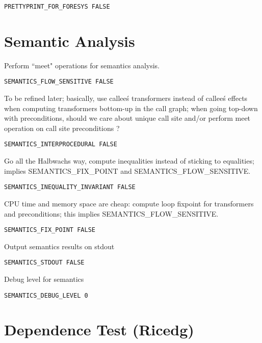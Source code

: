 \begin{verbatim}
PRETTYPRINT_FOR_FORESYS FALSE
\end{verbatim}

\section{Semantic Analysis}

Perform ``meet" operations for semantics analysis.

\begin{verbatim}
SEMANTICS_FLOW_SENSITIVE FALSE
\end{verbatim}

To be refined later; basically, use callee\'s transformers instead of
callee\'s effects when computing transformers bottom-up in the call graph;
when going top-down with preconditions, should we care about unique
call site and/or perform meet operation on call site preconditions ?

\begin{verbatim}
SEMANTICS_INTERPROCEDURAL FALSE
\end{verbatim}

Go all the Halbwachs way, compute inequalities instead of sticking
to equalities; implies SEMANTICS\_FIX\_POINT and SEMANTICS\_FLOW\_SENSITIVE.

\begin{verbatim}
SEMANTICS_INEQUALITY_INVARIANT FALSE
\end{verbatim}

CPU time and memory space are cheap: compute loop fixpoint for
transformers and preconditions; this implies SEMANTICS\_FLOW\_SENSITIVE.

\begin{verbatim}
SEMANTICS_FIX_POINT FALSE
\end{verbatim}

Output semantics results on stdout

\begin{verbatim}
SEMANTICS_STDOUT FALSE
\end{verbatim}

Debug level for semantics

\begin{verbatim}
SEMANTICS_DEBUG_LEVEL 0
\end{verbatim}

\section{Dependence Test (Ricedg)}

